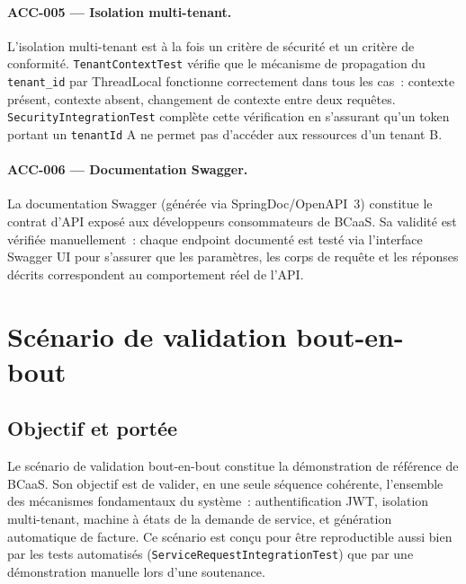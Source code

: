 \paragraph{ACC-005 — Isolation multi-tenant.}
L'isolation multi-tenant est à la fois un critère de sécurité et un critère de conformité.
\texttt{TenantContextTest} vérifie que le mécanisme de propagation du \texttt{tenant\_id}
par ThreadLocal fonctionne correctement dans tous les cas~: contexte présent, contexte
absent, changement de contexte entre deux requêtes. \texttt{SecurityIntegrationTest}
complète cette vérification en s'assurant qu'un token portant un \texttt{tenantId} A ne
permet pas d'accéder aux ressources d'un tenant B.

\paragraph{ACC-006 — Documentation Swagger.}
La documentation Swagger (générée via SpringDoc/OpenAPI~3) constitue le contrat d'API
exposé aux développeurs consommateurs de BCaaS. Sa validité est vérifiée manuellement~:
chaque endpoint documenté est testé via l'interface Swagger UI pour s'assurer que les
paramètres, les corps de requête et les réponses décrits correspondent au comportement
réel de l'API.

\section{Scénario de validation bout-en-bout}
\label{sec:scenario-e2e}

\subsection{Objectif et portée}
\label{subsec:e2e-objectif}

Le scénario de validation bout-en-bout constitue la démonstration de référence de BCaaS.
Son objectif est de valider, en une seule séquence cohérente, l'ensemble des mécanismes
fondamentaux du système~: authentification JWT, isolation multi-tenant, machine à états
de la demande de service, et génération automatique de facture. Ce scénario est conçu
pour être reproductible aussi bien par les tests automatisés (\texttt{ServiceRequestIntegrationTest})
que par une démonstration manuelle lors d'une soutenance.


